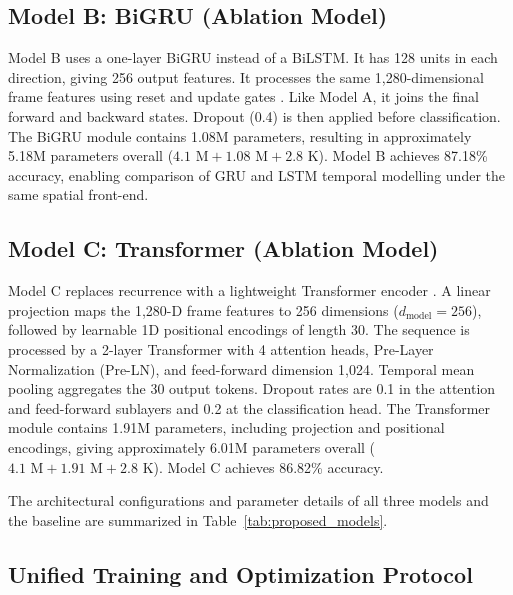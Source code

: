 \documentclass[journal]{IEEEtran}
\begin{document}
\subsection{Model B: BiGRU (Ablation Model)}

Model B uses a one-layer BiGRU instead of a BiLSTM. It has 128 units in each direction, giving 256 output features. It processes the same 1,280-dimensional frame features using reset and update gates \cite{cho2014learning}. Like Model A, it joins the final forward and backward states. Dropout (0.4) is then applied before classification. The BiGRU module contains 1.08M parameters, resulting in approximately 5.18M parameters overall ($4.1\text{ M} + 1.08\text{ M} + 2.8\text{ K}$). Model B achieves 87.18\% accuracy, enabling comparison of GRU and LSTM temporal modelling under the same spatial front-end.

\subsection{Model C: Transformer (Ablation Model)}

Model C replaces recurrence with a lightweight Transformer encoder \cite{vaswani2017attention}. A linear projection maps the 1,280-D frame features to 256 dimensions ($d_{\text{model}}=256$), followed by learnable 1D positional encodings of length 30. The sequence is processed by a 2-layer Transformer with 4 attention heads, Pre-Layer Normalization (Pre-LN), and feed-forward dimension 1,024. Temporal mean pooling aggregates the 30 output tokens. Dropout rates are 0.1 in the attention and feed-forward sublayers and 0.2 at the classification head. The Transformer module contains 1.91M parameters, including projection and positional encodings, giving approximately 6.01M parameters overall ($4.1\text{ M} + 1.91\text{ M} + 2.8\text{ K}$). Model C achieves 86.82\% accuracy.

The architectural configurations and parameter details of all three models and the baseline are summarized in Table~\ref{tab:proposed_models}.

\subsection{Unified Training and Optimization Protocol}
\end{document}
